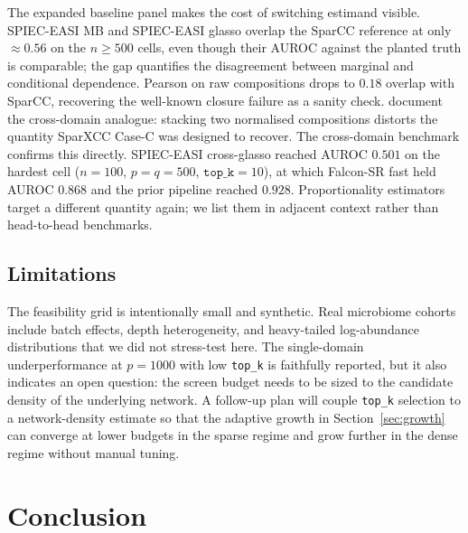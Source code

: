 \documentclass[unnumsec,webpdf,contemporary,large]{oup-authoring-template}
\theoremstyle{thmstyleone}
\theoremstyle{thmstyletwo}
\theoremstyle{thmstylethree}
\begin{document}
The expanded baseline panel makes the cost of switching estimand
visible. SPIEC-EASI MB and SPIEC-EASI glasso
\citep{kurtz2015spieceasi} overlap the SparCC reference at only
$\approx 0.56$ on the $n \geq 500$ cells, even though their AUROC
against the planted truth is comparable; the gap quantifies the
disagreement between marginal and conditional dependence. Pearson on
raw compositions drops to $0.18$ overlap with SparCC, recovering the
well-known closure failure as a sanity check.
\citet{brunner2024crosskingdom} document the cross-domain analogue:
stacking two normalised compositions distorts the quantity SparXCC
Case-C was designed to recover. The cross-domain benchmark confirms
this directly. SPIEC-EASI cross-glasso reached AUROC $0.501$ on the
hardest cell ($n = 100$, $p = q = 500$, $\texttt{top\_k} = 10$), at
which Falcon-SR fast held AUROC $0.868$ and the prior pipeline
reached $0.928$. Proportionality estimators
\citep{lovell2015proportionality} target a different quantity again;
we list them in adjacent context rather than head-to-head benchmarks.

\subsection{Limitations}\label{sec:discuss-limits}

The feasibility grid is intentionally small and synthetic. Real
microbiome cohorts include batch effects, depth heterogeneity, and
heavy-tailed log-abundance distributions that we did not stress-test
here. The single-domain underperformance at $p = 1000$ with low
\texttt{top\_k} is faithfully reported, but it also indicates an open
question: the screen budget needs to be sized to the candidate
density of the underlying network. A follow-up plan will couple
\texttt{top\_k} selection to a network-density estimate so that the
adaptive growth in Section~\ref{sec:growth} can converge at lower
budgets in the sparse regime and grow further in the dense regime
without manual tuning.

\section{Conclusion}\label{sec:conclusion}
\end{document}

